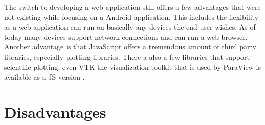 The switch to developing a web application still offers a few advantages that were not existing while focusing on a Android application. This includes the flexibility as a web application can run on basically any devices the end user wishes. As of today many devices support network connections and can run a web browser. Another advantage is that JavaScript offers a tremendous amount of third party libraries, especially plotting libraries. There a also a few libraries that support scientific plotting, even VTK the visualization toolkit that is used by ParaView is available as a JS version \cite{VTK}.

\section{Disadvantages}
